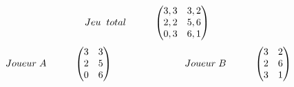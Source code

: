 \documentclass[a4paper, 12pt, twoside]{article}
\begin{document}
\[
Jeu \hspace{0,2cm} total \hspace{1cm}
\begin{pmatrix}
3,3 & 3,2\\
2,2 & 5,6\\
0,3 & 6,1\\
\end{pmatrix}\    
\]                  
\vspace{1 cm}
\[
Joueur\hspace{0,1cm} A\hspace{1cm}
\begin{pmatrix}3&3\\
2&5\\
0&6\\
\end{pmatrix}\                      \hspace{2,5cm}  
Joueur\hspace{0,1cm} B \hspace{1cm}  
\begin{pmatrix}3&2\\
2&6\\
3&1\\
\end{pmatrix} 
\]
\end{document}
